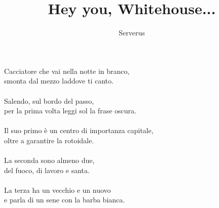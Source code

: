 \documentclass[12pt]{article}
\title{Hey you, Whitehouse...}
\date{}
\author{Serverus}
\begin{document}
\maketitle
\thispagestyle{empty}
\begin{center}
Cacciatore che vai nella notte in branco,\\
smonta dal mezzo laddove ti canto.\\
\ \\
Salendo, sul bordo del passo,\\
per la prima volta leggi sol la frase oscura.\\
\ \\
Il suo primo è un centro di importanza capitale,\\
oltre a garantire la rotoidale.\\
\ \\
La seconda sono almeno due, \\
del fuoco, di lavoro e santa.\\
\ \\
La terza ha un vecchio e un nuovo\\ 
e parla di un sene con la barba bianca.\\
\end{center}
\end{document}
